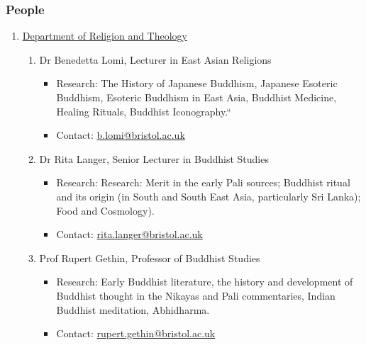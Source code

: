 \documentclass[a4paper,10.5pt]{article}
\begin{document}
\subsubsection{People}
\label{sec:org7c48481}
\begin{enumerate}
\item \href{http://www.bristol.ac.uk/religion/}{Department of Religion and Theology}
\label{sec:org4abfe5b}
\begin{enumerate}
\item Dr Benedetta Lomi, Lecturer in East Asian Religions
\label{sec:org5ccb8c9}
\begin{itemize}
\item Research: The History of Japanese Buddhism, Japanese Esoteric Buddhism, Esoteric Buddhism in East Asia, Buddhist Medicine, Healing Rituals, Buddhist Iconography.``\\
\item Contact: \href{mailto:b.lomi@bristol.ac.uk}{b.lomi@bristol.ac.uk}\\
\end{itemize}
\item Dr Rita Langer, Senior Lecturer in Buddhist Studies
\label{sec:orgb6f14f8}
\begin{itemize}
\item Research: Research: Merit in the early Pali sources; Buddhist ritual and its origin (in South and South East Asia, particularly Sri Lanka); Food and Cosmology).\\
\item Contact: \href{mailto:rita.langer@bristol.ac.uk}{rita.langer@bristol.ac.uk}\\
\end{itemize}
\item Prof Rupert Gethin, Professor of Buddhist Studies
\label{sec:org51c1603}
\begin{itemize}
\item Research: Early Buddhist literature, the history and development of Buddhist thought in the Nikayas and Pali commentaries, Indian Buddhist meditation, Abhidharma.\\
\item Contact: \href{mailto:rupert.gethin@bristol.ac.uk}{rupert.gethin@bristol.ac.uk}\\
\end{itemize}
\end{enumerate}
\end{enumerate}
\end{document}
